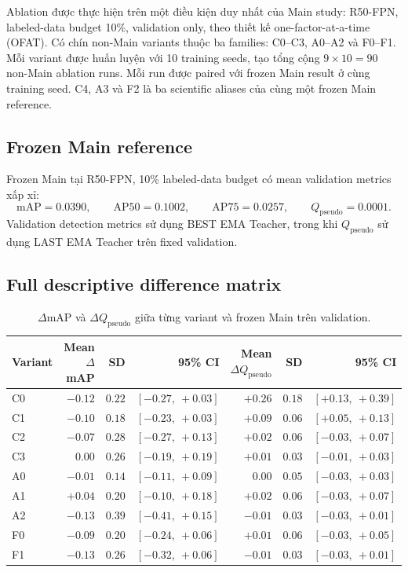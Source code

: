 \documentclass[pdflatex,sn-mathphys-num]{sn-jnl}%
\theoremstyle{thmstyleone}%
\theoremstyle{thmstyletwo}%
\theoremstyle{thmstylethree}%
\begin{document}
Ablation được thực hiện trên một điều kiện duy nhất của Main study: R50-FPN, labeled-data budget 10\%, validation only, theo thiết kế one-factor-at-a-time (OFAT). Có chín non-Main variants thuộc ba families: C0--C3, A0--A2 và F0--F1. Mỗi variant được huấn luyện với 10 training seeds, tạo tổng cộng $9\times10=90$ non-Main ablation runs. Mỗi run được paired với frozen Main result ở cùng training seed. C4, A3 và F2 là ba scientific aliases của cùng một frozen Main reference.

\subsection{Frozen Main reference}

Frozen Main tại R50-FPN, 10\% labeled-data budget có mean validation metrics xấp xỉ:
\[
\mathrm{mAP}=0.0390,\qquad
\mathrm{AP50}=0.1002,\qquad
\mathrm{AP75}=0.0257,\qquad
Q_{\mathrm{pseudo}}=0.0001.
\]
Validation detection metrics sử dụng BEST EMA Teacher, trong khi $Q_{\mathrm{pseudo}}$ sử dụng LAST EMA Teacher trên fixed validation.

\subsection{Full descriptive difference matrix}

\begin{table}[htbp]
\centering
\caption{$\Delta$mAP và $\Delta Q_{\mathrm{pseudo}}$ giữa từng variant và frozen Main trên validation.}
\label{tab:supp_ablation_map_q}
\small
\begin{tabular}{lrrrrrr}
\toprule
\textbf{Variant} & \textbf{Mean $\Delta$mAP} & \textbf{SD} & \textbf{95\% CI} &
\textbf{Mean $\Delta Q_{\mathrm{pseudo}}$} & \textbf{SD} & \textbf{95\% CI}\\
\midrule
C0 & $-0.12$ & $0.22$ & $[-0.27,\ +0.03]$ & $+0.26$ & $0.18$ & $[+0.13,\ +0.39]$\\
C1 & $-0.10$ & $0.18$ & $[-0.23,\ +0.03]$ & $+0.09$ & $0.06$ & $[+0.05,\ +0.13]$\\
C2 & $-0.07$ & $0.28$ & $[-0.27,\ +0.13]$ & $+0.02$ & $0.06$ & $[-0.03,\ +0.07]$\\
C3 & $0.00$ & $0.26$ & $[-0.19,\ +0.19]$ & $+0.01$ & $0.03$ & $[-0.01,\ +0.03]$\\
A0 & $-0.01$ & $0.14$ & $[-0.11,\ +0.09]$ & $0.00$ & $0.05$ & $[-0.03,\ +0.03]$\\
A1 & $+0.04$ & $0.20$ & $[-0.10,\ +0.18]$ & $+0.02$ & $0.06$ & $[-0.03,\ +0.07]$\\
A2 & $-0.13$ & $0.39$ & $[-0.41,\ +0.15]$ & $-0.01$ & $0.03$ & $[-0.03,\ +0.01]$\\
F0 & $-0.09$ & $0.20$ & $[-0.24,\ +0.06]$ & $+0.01$ & $0.06$ & $[-0.03,\ +0.05]$\\
F1 & $-0.13$ & $0.26$ & $[-0.32,\ +0.06]$ & $-0.01$ & $0.03$ & $[-0.03,\ +0.01]$\\
\bottomrule
\end{tabular}
\end{table}
\end{document}

